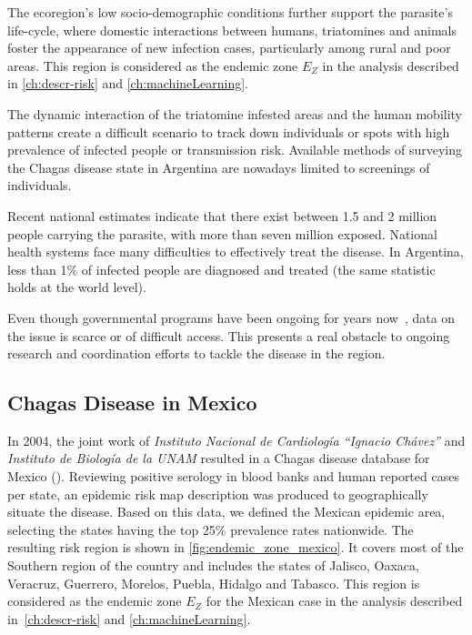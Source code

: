 The ecoregion's low socio-demographic conditions further support the parasite's life-cycle, where domestic interactions between humans, triatomines and animals foster the appearance of new infection cases, particularly among rural and poor areas.
This region is considered as the endemic zone $E_Z$ in the analysis described in \cref{ch:descr-risk} and \cref{ch:machineLearning}.



The dynamic interaction of the triatomine infested areas and the human mobility patterns create a difficult scenario to track down individuals or spots with high prevalence of infected people or transmission risk.
Available methods of surveying the Chagas disease state in Argentina are nowadays limited to screenings of individuals.

Recent national estimates indicate that there exist between 1.5 and 2 million people carrying the parasite, with more than seven million exposed. National health systems face many difficulties to effectively treat the disease.
In Argentina, less than 1\% of infected people are diagnosed and treated
(the same statistic holds at the world level).

Even though governmental programs have been ongoing for years now~\citep{plan_nacional_chagas}, data on the issue is scarce or of difficult access.
This presents a real obstacle to ongoing research and coordination efforts to tackle the disease in the region.


\subsection{Chagas Disease in  Mexico}\label{endemic_zone_mexico}


In 2004, the joint work of \textit{Instituto Nacional de Cardiología ``Ignacio Chávez''} and  \textit{Instituto de Biología de la UNAM} resulted in a Chagas disease database for Mexico (\citep{cruz2006chagmex}).
Reviewing positive serology in blood banks and human reported cases per state, an epidemic risk map description was produced to geographically situate the disease.
Based on this data, we defined the Mexican epidemic area, selecting the states having the top 25\% prevalence rates nationwide.
The resulting risk region is shown in \cref{fig:endemic_zone_mexico}.
It covers most of the Southern region of the country and includes the states of Jalisco, Oaxaca, Veracruz, Guerrero, Morelos, Puebla, Hidalgo and Tabasco.
This region is considered as the endemic zone $E_Z$ for the Mexican case in the analysis described in~\cref{ch:descr-risk} and \cref{ch:machineLearning}.


